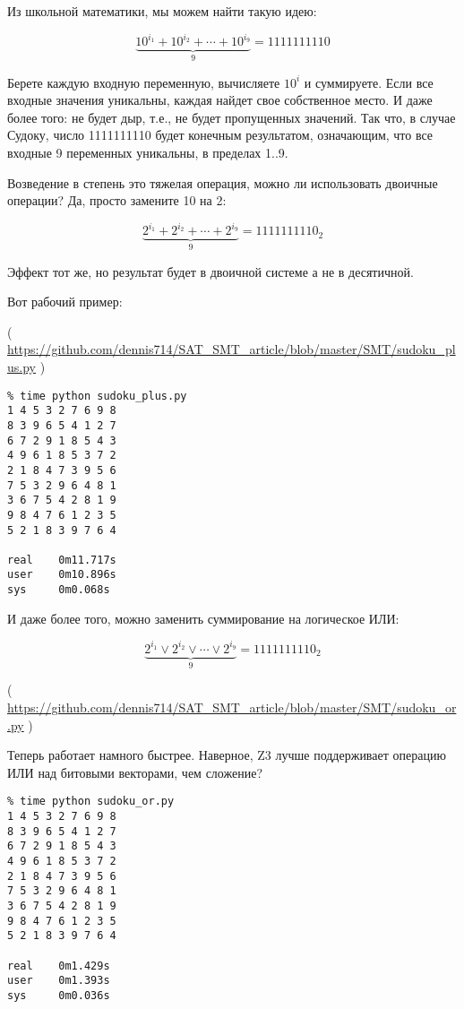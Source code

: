 Из школьной математики, мы можем найти такую идею:

\begin{equation}
\underbrace{10^{i_1} + 10^{i_2} + \cdots + 10^{i_9}}_9 = 1111111110
\end{equation}

Берете каждую входную переменную, вычисляете $10^i$ и суммируете.
Если все входные значения уникальны, каждая найдет свое собственное место.
И даже более того: не будет дыр, т.е., не будет пропущенных значений.
Так что, в случае Судоку, число 1111111110 будет конечным результатом, означающим, что все входные
9 переменных уникальны, в пределах 1..9.

Возведение в степень это тяжелая операция, можно ли использовать двоичные операции? Да, просто замените 10 на 2:

\begin{equation}
\underbrace{2^{i_1} + 2^{i_2} + \cdots + 2^{i_9}}_9 = 1111111110_2
\end{equation}

Эффект тот же, но результат будет в двоичной системе а не в десятичной.

Вот рабочий пример:


( \url{https://github.com/dennis714/SAT_SMT_article/blob/master/SMT/sudoku_plus.py} )

\begin{lstlisting}
% time python sudoku_plus.py
1 4 5 3 2 7 6 9 8
8 3 9 6 5 4 1 2 7
6 7 2 9 1 8 5 4 3
4 9 6 1 8 5 3 7 2
2 1 8 4 7 3 9 5 6
7 5 3 2 9 6 4 8 1
3 6 7 5 4 2 8 1 9
9 8 4 7 6 1 2 3 5
5 2 1 8 3 9 7 6 4

real    0m11.717s
user    0m10.896s
sys     0m0.068s
\end{lstlisting}

И даже более того, можно заменить суммирование на логическое ИЛИ:

\begin{equation}
\underbrace{2^{i_1} \vee 2^{i_2} \vee \cdots \vee 2^{i_9}}_9 = 1111111110_2
\end{equation}


( \url{https://github.com/dennis714/SAT_SMT_article/blob/master/SMT/sudoku_or.py} )

Теперь работает намного быстрее. Наверное, Z3 лучше поддерживает операцию ИЛИ над битовыми векторами, чем сложение?

\begin{lstlisting}
% time python sudoku_or.py
1 4 5 3 2 7 6 9 8
8 3 9 6 5 4 1 2 7
6 7 2 9 1 8 5 4 3
4 9 6 1 8 5 3 7 2
2 1 8 4 7 3 9 5 6
7 5 3 2 9 6 4 8 1
3 6 7 5 4 2 8 1 9
9 8 4 7 6 1 2 3 5
5 2 1 8 3 9 7 6 4

real    0m1.429s
user    0m1.393s
sys     0m0.036s
\end{lstlisting}

